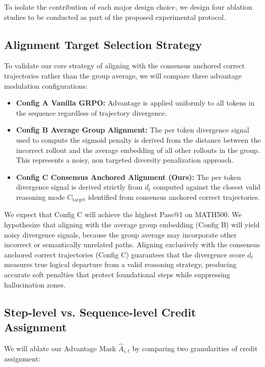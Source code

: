 \documentclass[conference]{IEEEtran}
\begin{document}
To isolate the contribution of each major design choice, we design four ablation studies to be conducted as part of the proposed experimental protocol.

\subsection{Alignment Target Selection Strategy}

To validate our core strategy of aligning with the consensus anchored correct trajectories rather than the group average, we will compare three advantage modulation configurations:

\begin{itemize}
    \item \textbf{Config A Vanilla GRPO:} Advantage is applied uniformly to all tokens in the sequence regardless of trajectory divergence.
    \item \textbf{Config B Average Group Alignment:} The per token divergence signal used to compute the sigmoid penalty is derived from the distance between the incorrect rollout and the average embedding of all other rollouts in the group. This represents a noisy, non targeted diversity penalization approach.
    \item \textbf{Config C Consensus Anchored Alignment (Ours):} The per token divergence signal is derived strictly from $d_t$ computed against the closest valid reasoning mode $C_{\mathrm{target}}$ identified from consensus anchored correct trajectories.
\end{itemize}

We expect that Config C will achieve the highest Pass@1 on MATH500. We hypothesize that aligning with the average group embedding (Config B) will yield noisy divergence signals, because the group average may incorporate other incorrect or semantically unrelated paths. Aligning exclusively with the consensus anchored correct trajectories (Config C) guarantees that the divergence score $d_t$ measures true logical departure from a valid reasoning strategy, producing accurate soft penalties that protect foundational steps while suppressing hallucination zones.

\subsection{Step-level vs. Sequence-level Credit Assignment}

We will ablate our Advantage Mask $\hat{A}_{i,t}$ by comparing two granularities of credit assignment:
\end{document}
